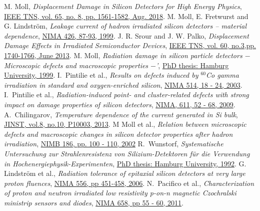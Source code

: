 








\begin{thebibliography}{99}
M. Moll, {\em Displacement Damage in Silicon Detectors for High Energy Physics}, 
\href{http://doi.org/10.1109/TNS.2018.2819506}{IEEE TNS, vol. 65, no. 8, pp. 1561-1582, Aug. 2018}.
%
M. Moll, E. Fretwurst and G. Lindstr{\"o}m, {\em Leakage current of hadron irradiated silicon detectors – material dependence}, 
\href{https://doi.org/10.1016/S0168-9002(98)01475-2}{NIMA 426, 87-93, 1999}.
%
J. R. Srour and J. W. Palko,
{\em Displacement Damage Effects in Irradiated Semiconductor Devices}, 
\href{https://doi.org/10.1109/TNS.2013.2261316}{IEEE TNS, vol. 60, no.3,pp. 1740-1766,  June 2013}.
%
    M. Moll, {\em Radiation damage in silicon particle detectors $-$ Microscopic defects and macroscopic properties $-$'}, \href{http://cds.cern.ch/record/425274}{PhD thesis: Hamburg University, 1999}.
%    
I.~Pintilie et al., 
{\em Results on defects induced by $^{60}${Co} gamma irradiation in standard and oxygen-enriched silicon},
\href{https://doi.org/10.1016/j.nima.2003.08.079}{NIMA 514, 18 - 24, 2003}.
%
I.~Pintilie et al., {\em Radiation-induced point- and cluster-related defects with strong impact on damage properties of silicon detectors},
\href{https://doi.org/10.1016/j.nima.2009.09.065}{NIMA, 611, 52 - 68, 2009}.
%
A.~Chilingarov, {\em Temperature dependence of the current generated in {Si} bulk},
\href{https://doi.org/10.1088/1748-0221/8/10/P10003}{JINST, vol.8, no.10, P10003, 2013}.
%
M Moll et al., 
{\em Relation between microscopic defects and macroscopic changes in silicon detector properties after hadron irradiation}, \href{https://doi.org/10.1016/S0168-583X(01)00866-7}{NIMB 186, pp. 100 - 110, 2002}
%
 R.~Wunstorf, {\em Systematische Untersuchung zur Strahlenresistenz von Silizium-Detektoren
         f{\"u}r die Verwendung in Hochenergiephysik-Experimenten}, 
\href{https://cds.cern.ch/record/243081}{PhD thesis: Hamburg University, 1992}.
%
G. Lindstr{\"o}m et al., {\em Radiation tolerance of epitaxial silicon detectors at very large proton fluences},
\href{https://doi.org/10.1016/j.nima.2005.10.103}{NIMA 556, pp 451-458, 2006}.
%
N.~Pacifico et al., {\em Characterization of proton and neutron irradiated low resistivity p-on-n magnetic Czochralski ministrip sensors and diodes}, 
\href{https://doi.org/10.1016/j.nima.2011.03.026}{NIMA 658, pp 55 - 60, 2011}.
\end{thebibliography}

